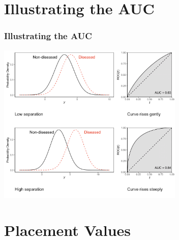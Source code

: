 \documentclass[t]{beamer}
\begin{document}
\section{Illustrating the AUC}

\begin{frame}
\frametitle{Illustrating the AUC}
\begin{center}
\includegraphics[width=3.5in]{plots}
\end{center}
\end{frame}

\section{Placement Values}
\end{document}
